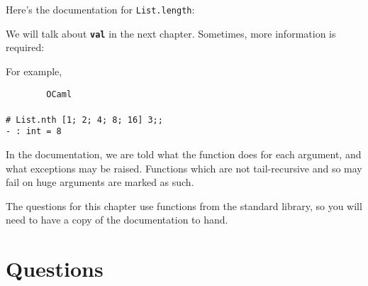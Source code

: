 \documentclass[]{book}
\newcommand{\smspace}{\vspace{4mm}}
\begin{document}
\noindent Here's the documentation for \texttt{List.length}:

\smspace
\begin{center}
\end{center}
\smspace

\noindent We will talk about \texttt{\textbf{val}} in the next chapter. Sometimes, more information is required:

\smspace
\begin{center}
\end{center}
\smspace

\noindent For example,

\smspace
\noindent\verb!        OCaml!\\
\noindent\\
\noindent\texttt{\# List.nth [1; 2; 4; 8; 16] 3;;}\\
\noindent\verb!- : int = 8!
\smspace

\noindent In the documentation, we are told what the function does for each argument, and what exceptions may be raised. Functions which are not tail-recursive and so may fail on huge arguments are marked as such.

The questions for this chapter use functions from the standard library, so you will need to have a copy of the documentation to hand.

\clearpage
\section*{Questions}
\end{document}
